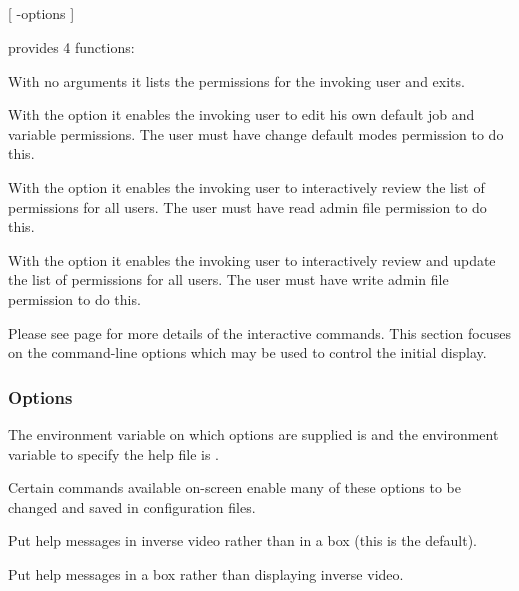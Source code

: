 \subsection{\BtuserName}

\begin{expara}

\BtuserName{} [ -options ]

\end{expara}

\PrBtuser{} provides 4 functions:

With no arguments it lists the permissions for the invoking user and exits.

With the  option it enables the invoking user to edit his own default job and variable permissions. The user must
have change default modes permission to do this.

With the  option it enables the invoking user to interactively review the list of permissions for all users. The user
must have read admin file permission to do this.

With the  option it enables the invoking user to interactively review and update the list of permissions for all
users. The user must have write admin file permission to do this.

Please see page \pageref{bkm:Btuserdescr} for more details of the interactive commands.
This section focuses on the command-line options which may be used to control the initial display.

\subsubsection{Options}
The environment variable on which options are supplied is \filename{\BtuserVarname} and the environment variable to specify the
help file is .

Certain commands available on-screen enable many of these options to be changed and saved in configuration files.

\explainopt


Put help messages in inverse video rather than in a box (this is the default).


Put help messages in a box rather than displaying inverse video.

